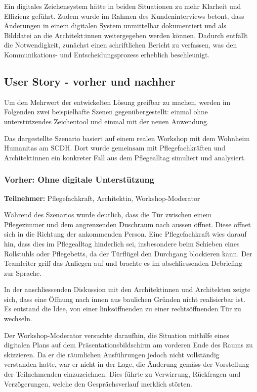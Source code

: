 Ein digitales Zeichensystem hätte in beiden Situationen zu mehr Klarheit und Effizienz geführt.  
Zudem wurde im Rahmen des Kundeninterviews betont, dass Änderungen in einem digitalen System unmittelbar dokumentiert und als Bilddatei an die Architekt:innen weitergegeben werden können. Dadurch entfällt die Notwendigkeit, zunächst einen schriftlichen Bericht zu verfassen, was den Kommunikations- und Entscheidungsprozess erheblich beschleunigt.
\clearpage

\subsection{User Story - vorher und nachher}

Um den Mehrwert der entwickelten Lösung greifbar zu machen, werden im Folgenden zwei beispielhafte Szenen gegenübergestellt: einmal ohne unterstützendes Zeichentool und einmal mit der neuen Anwendung. 

Das dargestellte Szenario basiert auf einem realen Workshop mit dem Wohnheim Humanitas am SCDH. Dort wurde gemeinsam mit Pflegefachkräften und Architektinnen ein konkreter Fall aus dem Pflegealltag simuliert und analysiert.

\subsubsection*{Vorher: Ohne digitale Unterstützung}

\textbf{Teilnehmer:} Pflegefachkraft, Architektin, Workshop-Moderator

Während des Szenarios wurde deutlich, dass die Tür zwischen einem Pflegezimmer und dem angrenzenden Duschraum nach aussen öffnet. Diese öffnet sich in die Richtung der ankommenden Person. Eine Pflegefachkraft wies darauf hin, dass dies im Pflegealltag hinderlich sei, insbesondere beim Schieben eines Rollstuhls oder Pflegebetts, da der Türflügel den Durchgang blockieren kann. Der Teamleiter griff das Anliegen auf und brachte es im abschliessenden Debriefing zur Sprache.

In der anschliessenden Diskussion mit den Architektinnen und Architekten zeigte sich, dass eine Öffnung nach innen aus baulichen Gründen nicht realisierbar ist. Es entstand die Idee, von einer linksöffnenden zu einer rechtsöffnenden Tür zu wechseln.

Der Workshop-Moderator versuchte daraufhin, die Situation mithilfe eines digitalen Plans auf dem Präsentationsbildschirm am vorderen Ende des Raums zu skizzieren. Da er die räumlichen Ausführungen jedoch nicht vollständig verstanden hatte, war er nicht in der Lage, die Änderung gemäss der Vorstellung der Teilnehmenden einzuzeichnen. Dies führte zu Verwirrung, Rückfragen und Verzögerungen, welche den Gesprächsverlauf merklich störten.

